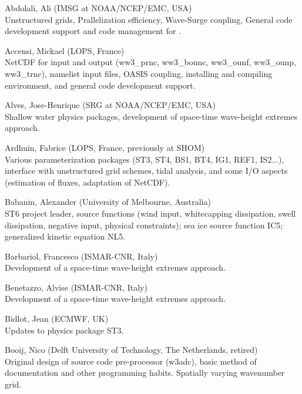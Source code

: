 \begin{list}{\ldots}{ }

\item [Abdolali, Ali] (IMSG at NOAA/NCEP/EMC, USA) \\
  Unstructured grids, Prallelization efficiency, Wave-Surge coupling, General code development support and code management for \ws.

\item [Accensi, Mickael] (LOPS, France) \\
  NetCDF for input and output (ww3\_prnc, ww3\_bounc, ww3\_ounf, ww3\_ounp, ww3\_trnc), namelist input files, OASIS coupling, installing and compiling environment, and general code development support.

\item [Alves, Jose-Henrique] (SRG at NOAA/NCEP/EMC, USA) \\
  Shallow water physics packages, development of space-time wave-height extremes approach.

\item [Ardhuin, Fabrice] (LOPS, France, previously at SHOM) \\
  Various parameterization packages (ST3, ST4, BS1, BT4, IG1, REF1, IS2...), interface with unstructured grid schemes, tidal analysis, and some I/O aspects (estimation of fluxes, adaptation of NetCDF). 

\item [Babanin, Alexander] (University of Melbourne, Australia)\\
  ST6 project leader, source functions (wind input, whitecapping dissipation, swell dissipation, negative input, physical constraints); sea ice source function IC5; generalized kinetic equation NL5.

\item [Barbariol, Francesco] (ISMAR-CNR, Italy) \\
  Development of a space-time wave-height extremes approach.

\item [Benetazzo, Alvise] (ISMAR-CNR, Italy) \\
  Development of a space-time wave-height extremes approach.

\item [Bidlot, Jean] (ECMWF, UK) \\
  Updates to physics package ST3.

\item [Booij, Nico] (Delft University of Technology, The Netherlands, retired) \\
  Original design of source code pre-processor ({\code w3adc}), basic method
  of documentation and other programming habits. Spatially varying wavenumber
  grid.


\end{list}
